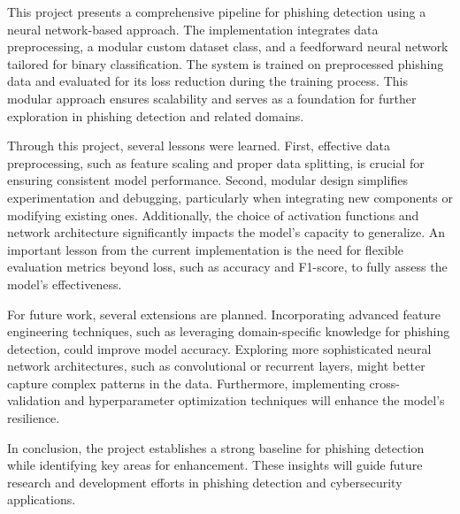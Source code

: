 This project presents a comprehensive pipeline for phishing detection using a neural network-based approach. The implementation integrates data preprocessing, a modular custom dataset class, and a feedforward neural network tailored for binary classification. The system is trained on preprocessed phishing data and evaluated for its loss reduction during the training process. This modular approach ensures scalability and serves as a foundation for further exploration in phishing detection and related domains.

Through this project, several lessons were learned. First, effective data preprocessing, such as feature scaling and proper data splitting, is crucial for ensuring consistent model performance. Second, modular design simplifies experimentation and debugging, particularly when integrating new components or modifying existing ones. Additionally, the choice of activation functions and network architecture significantly impacts the model's capacity to generalize. An important lesson from the current implementation is the need for flexible evaluation metrics beyond loss, such as accuracy and F1-score, to fully assess the model's effectiveness.

For future work, several extensions are planned. Incorporating advanced feature engineering techniques, such as leveraging domain-specific knowledge for phishing detection, could improve model accuracy. Exploring more sophisticated neural network architectures, such as convolutional or recurrent layers, might better capture complex patterns in the data. Furthermore, implementing cross-validation and hyperparameter optimization techniques will enhance the model's resilience.

In conclusion, the project establishes a strong baseline for phishing detection while identifying key areas for enhancement. These insights will guide future research and development efforts in phishing detection and cybersecurity applications.

